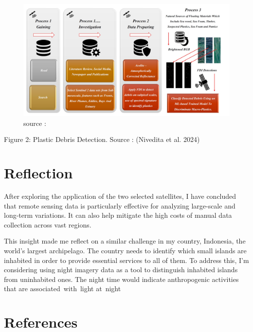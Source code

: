 \documentclass[
  letterpaper,
  DIV=11,
  numbers=noendperiod]{scrreprt}
\begin{document}
\begin{itemize}
  \begin{figure}

  {\centering \includegraphics{images/Screenshot 2025-02-09 164424.jpg}

  }

  \caption{source :}

  \end{figure}

  Figure 2: Plastic Debris Detection. Source : (Nivedita et al. 2024)
\end{itemize}

\hypertarget{reflection}{%
\section{Reflection}\label{reflection}}

After exploring the application of the two selected satellites, I have
concluded that remote sensing data is particularly effective for
analyzing large-scale and long-term variations. It can also help
mitigate the high costs of manual data collection across vast regions.

This insight made me reflect on a similar challenge in my country,
Indonesia, the world's largest archipelago. The country needs to
identify which small islands are inhabited in order to provide essential
services to all of them. To address this, I'm considering using night
imagery data as a tool to distinguish inhabited islands from uninhabited
ones. The night time would indicate anthropogenic activities that are
associated~with~light at~night

\hypertarget{references}{%
\section{References}\label{references}}
\end{document}
